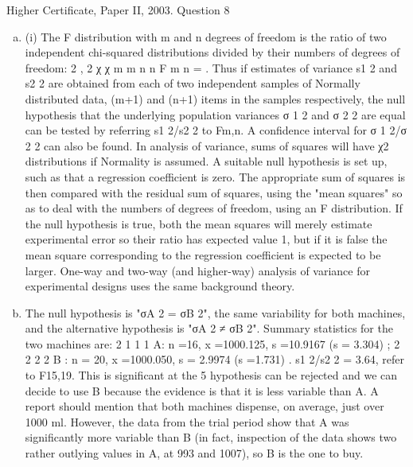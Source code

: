 \documentclass[a4paper,12pt]{article}
\begin{document}
Higher Certificate, Paper II, 2003. Question 8
\begin{enumerate}[(a)]
\item (i) The F distribution with m and n degrees of freedom is the ratio of two
independent chi-squared distributions divided by their numbers of degrees of
freedom:
2
, 2
χ
χ
m
m n
n
F m
n
= .
Thus if estimates of variance s1
2 and s2
2 are obtained from each of two
independent samples of Normally distributed data, (m+1) and (n+1) items in
the samples respectively, the null hypothesis that the underlying population
variances σ 1
2 and σ 2
2 are equal can be tested by referring s1
2/s2
2 to Fm,n. A
confidence interval for σ 1
2/σ 2
2 can also be found.
In analysis of variance, sums of squares will have χ2 distributions if Normality
is assumed. A suitable null hypothesis is set up, such as that a regression
coefficient is zero. The appropriate sum of squares is then compared with the
residual sum of squares, using the "mean squares" so as to deal with the
numbers of degrees of freedom, using an F distribution. If the null hypothesis
is true, both the mean squares will merely estimate experimental error so their
ratio has expected value 1, but if it is false the mean square corresponding to
the regression coefficient is expected to be larger. One-way and two-way (and
higher-way) analysis of variance for experimental designs uses the same
background theory.
\item  The null hypothesis is "σA
2 = σB
2", the same variability for both machines, and
the alternative hypothesis is "σA
2 ≠ σB
2".
Summary statistics for the two machines are:
2
1 1 1 A: n =16, x =1000.125, s =10.9167 (s = 3.304) ;
2
2 2 2 B : n = 20, x =1000.050, s = 2.9974 (s =1.731) .
s1
2/s2
2 = 3.64, refer to F15,19. This is significant at the 5%
hypothesis can be rejected and we can decide to use B because the evidence is
that it is less variable than A.
A report should mention that both machines dispense, on average, just over
1000 ml. However, the data from the trial period show that A was
significantly more variable than B (in fact, inspection of the data shows two
rather outlying values in A, at 993 and 1007), so B is the one to buy.
\end{enumerate}
\end{document}
